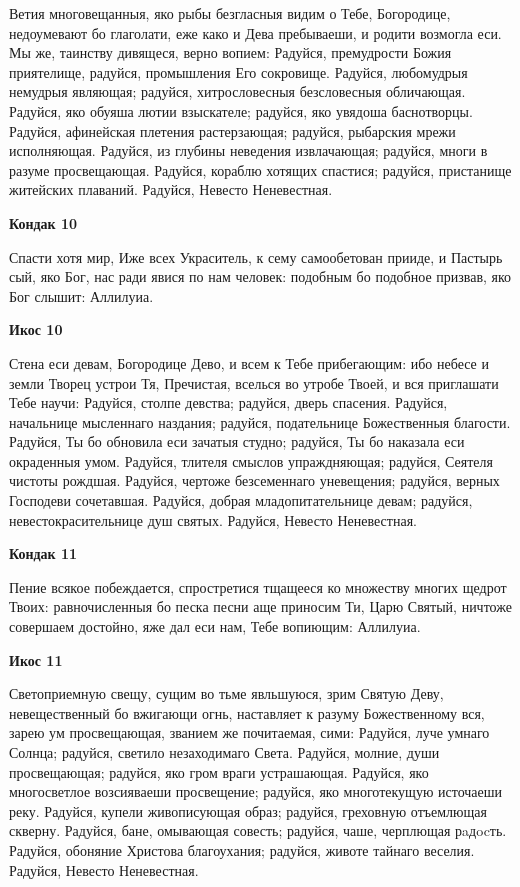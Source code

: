 Ветия многовещанныя, яко рыбы безгласныя видим о Тебе, Богородице, недоумевают бо глаголати, еже како и Дева пребываеши, и родити возмогла еси. Мы же, таинству дивящеся, верно вопием: Радуйся, премудрости Божия приятелище, радуйся, промышления Его сокровище. Радуйся, любомудрыя немудрыя являющая; радуйся, хитрословесныя безсловесныя обличающая. Радуйся, яко обуяша лютии взыскателе; радуйся, яко увядоша баснотворцы. Радуйся, афинейская плетения растерзающая; радуйся, рыбарския мрежи исполняющая. Радуйся, из глубины неведения извлачающая; радуйся, многи в разуме просвещающая. Радуйся, кораблю хотящих спастися; радуйся, пристанище житейских плаваний. Радуйся, Невесто Неневестная.


\bfseries Кондак 10\normalfont{}\nopagebreak


Спасти хотя мир, Иже всех Украситель, к сему самообетован прииде, и Пастырь сый, яко Бог, нас ради явися по нам человек: подобным бо подобное призвав, яко Бог слышит: Аллилуиа.


\bfseries Икос 10\normalfont{}\nopagebreak


Стена еси девам, Богородице Дево, и всем к Тебе прибегающим: ибо небесе и земли Творец устрои Тя, Пречистая, вселься во утробе Твоей, и вся приглашати Тебе научи: Радуйся, столпе девства; радуйся, дверь спасения. Радуйся, начальнице мысленнаго наздания; радуйся, подательнице Божественныя благости. Радуйся, Ты бо обновила еси зачатыя студно; радуйся, Ты бо наказала еси окраденныя умом. Радуйся, тлителя смыслов упраждняющая; радуйся, Сеятеля чистоты рождшая. Радуйся, чертоже безсеменнаго уневещения; радуйся, верных Господеви сочетавшая. Радуйся, добрая младопитательнице девам; радуйся, невестокрасительнице душ святых. Радуйся, Невесто Неневестная.


\bfseries Кондак 11\normalfont{}\nopagebreak


Пение всякое побеждается, спростретися тщащееся ко множеству многих щедрот Твоих: равночисленныя бо песка песни аще приносим Ти, Царю Святый, ничтоже совершаем достойно, яже дал еси нам, Тебе вопиющим: Аллилуиа.


\bfseries Икос 11\normalfont{}\nopagebreak


Светоприемную свещу, сущим во тьме явльшуюся, зрим Святую Деву, невещественный бо вжигающи огнь, наставляет к разуму Божественному вся, зарею ум просвещающая, званием же почитаемая, сими: Радуйся, луче умнаго Солнца; радуйся, светило незаходимаго Света. Радуйся, молние, души просвещающая; радуйся, яко гром враги устрашающая. Радуйся, яко многосветлое возсияваеши просвещение; радуйся, яко многотекущую источаеши реку. Радуйся, купели живописующая образ; радуйся, греховную отъемлющая скверну. Радуйся, бане, омывающая совесть; радуйся, чаше, черплющая рaдocть. Радуйся, обоняние Христова благоухания; радуйся, животе тайнаго веселия. Радуйся, Невесто Неневестная.


